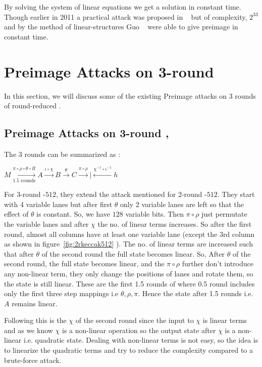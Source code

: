     By solving the system of linear equations we get a solution in constant time. Though earlier in 2011 a practical attack was proposed in ~\cite{naya2011practical} but of complexity, $2^{33}$ and by the method of linear-structures Guo \etal ~\cite{guo2016linear} were able to give preimage in constant time.

\section{Preimage Attacks on 3-round \KECCAK{}}

In this section, we will discuss some of the existing Preimage attacks on 3 rounds of round-reduced \KECCAK{}.

\subsection{Preimage Attacks on 3-round , }

        The 3 rounds can be summarized as :
    
    $ M \xrightarrow[\text{1.5 rounds}]{ \pi \circ \rho \circ \theta \circ R} A \xrightarrow[]{ \iota \circ \chi } B \xrightarrow[]{ \theta } C \xrightarrow[]{ \pi \circ \rho } | \xleftarrow[]{ \chi^{-1} \circ \iota^{-1} } h  $

        For 3-round \KECCAK-$512$, they extend the attack mentioned for 2-round \KECCAK-$512$. They start with 4 variable lanes but after first $\theta$ only 2 variable lanes are left so that the effect of $\theta$ is constant. So, we have $128$ variable bits. Then $\pi \circ \rho$ just permutate the variable lanes and after $\chi$ the no. of linear terms increases. So after the first round, almost all columns have at least one variable lane (except the 3rd column as shown in figure~\ref{fig:2rkeccak512} ). The no. of linear terms are increased such that after $\theta$ of the second round the full state becomes linear. So, After $\theta$ of the second round, the full state becomes linear, and the $\pi \circ \rho$ further don't introduce any non-linear term, they only change the positions of lanes and rotate them, so the state is still linear.  These are the first 1.5 rounds of \KECCAK{} where 0.5 round includes only the first three step mappings i.e $\theta, \rho, \pi$. Hence the state after 1.5 rounds i.e. $A$ remains linear.
        
        Following this is the $\chi$ of the second round since the input to $\chi$ is linear terms and as we know $\chi$ is a non-linear operation so the output state after $\chi$ is a non-linear i.e. quadratic state. Dealing with non-linear terms is not easy, so the idea is to linearize the quadratic terms and try to reduce the complexity compared to a brute-force attack.

